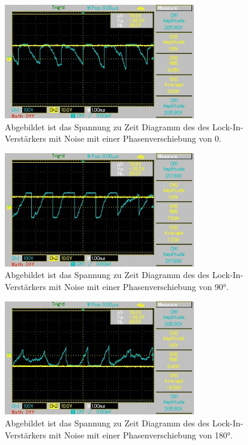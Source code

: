\begin{figure}[H]
  \centering
  \includegraphics[height=5cm]{Bilder/n_phi0.jpg}
  \caption{Abgebildet ist das Spannung zu Zeit Diagramm des des Lock-In-Verstärkers mit Noise mit einer Phasenverschiebung von 0.}
  \label{fig:n_phi0}
\end{figure}

\begin{figure}[H]
  \centering
  \includegraphics[height=5cm]{Bilder/n_phi90.jpg}
  \caption{Abgebildet ist das Spannung zu Zeit Diagramm des des Lock-In-Verstärkers mit Noise mit einer Phasenverschiebung von 90°.}
  \label{fig:n_phi90}
\end{figure}

\begin{figure}[H]
  \centering
  \includegraphics[height=5cm]{Bilder/n_phi180.jpg}
  \caption{Abgebildet ist das Spannung zu Zeit Diagramm des des Lock-In-Verstärkers mit Noise mit einer Phasenverschiebung von 180°.}
  \label{fig:n_phi180}
\end{figure}

